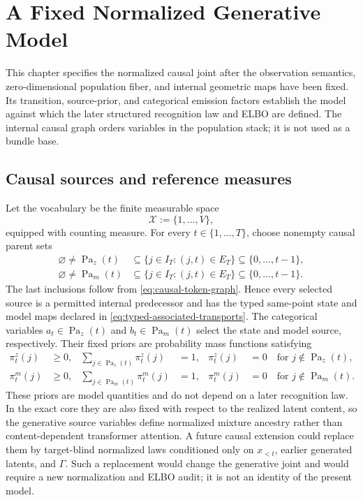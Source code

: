\chapter{A Fixed Normalized Generative Model}

This chapter specifies the normalized causal joint after the observation semantics, zero-dimensional population fiber, and internal geometric maps have been fixed. Its transition, source-prior, and categorical emission factors establish the model against which the later structured recognition law and ELBO are defined. The internal causal graph orders variables in the population stack; it is not used as a bundle base.

\section{Causal sources and reference measures}

Let the vocabulary be the finite measurable space
\begin{equation}
\mathcal X:=\{1,\ldots,V\},
\label{eq:vocabulary-space}
\end{equation}
equipped with counting measure.  For every $t\in\{1,\ldots,T\}$, choose nonempty causal parent sets
\begin{equation}
\begin{aligned}
\varnothing\ne\operatorname{Pa}_z(t)
&\subseteq\{j\in I_T:(j,t)\in E_T\}
\subseteq\{0,\ldots,t-1\},
\\
\varnothing\ne\operatorname{Pa}_m(t)
&\subseteq\{j\in I_T:(j,t)\in E_T\}
\subseteq\{0,\ldots,t-1\}.
\end{aligned}
\label{eq:nonempty-causal-parent-sets}
\end{equation}
The last inclusions follow from \cref{eq:causal-token-graph}. Hence every selected source is a permitted internal predecessor and has the typed same-point state and model maps declared in \cref{eq:typed-associated-transports}. The categorical variables $a_t\in\operatorname{Pa}_z(t)$ and $b_t\in\operatorname{Pa}_m(t)$ select the state and model source, respectively. Their fixed priors are probability mass functions satisfying
\begin{equation}
\begin{aligned}
\pi_t^z(j)&\geq0,
&\sum_{j\in\operatorname{Pa}_z(t)}\pi_t^z(j)&=1,
&\pi_t^z(j)&=0\quad\text{for }j\notin\operatorname{Pa}_z(t),\\
\pi_t^m(j)&\geq0,
&\sum_{j\in\operatorname{Pa}_m(t)}\pi_t^m(j)&=1,
&\pi_t^m(j)&=0\quad\text{for }j\notin\operatorname{Pa}_m(t).
\end{aligned}
\label{eq:normalized-causal-source-priors}
\end{equation}
These priors are model quantities and do not depend on a later recognition law. In the exact core they are also fixed with respect to the realized latent content, so the generative source variables define normalized mixture ancestry rather than content-dependent transformer attention. A future causal extension could replace them by target-blind normalized laws conditioned only on $x_{<t}$, earlier generated latents, and $\Gamma$. Such a replacement would change the generative joint and would require a new normalization and ELBO audit; it is not an identity of the present model.

